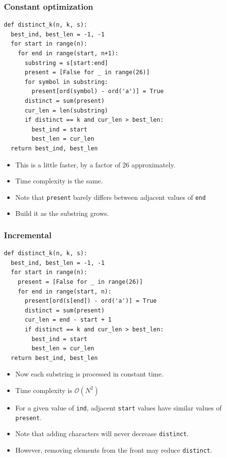 \documentclass{beamer}
\begin{document}
\begin{frame}
    \frametitle{Constant optimization}
	\begin{tiny}
        \begin{verbatim}
def distinct_k(n, k, s):
  best_ind, best_len = -1, -1
  for start in range(n):
    for end in range(start, n+1):
      substring = s[start:end]
      present = [False for _ in range(26)]
      for symbol in substring:
        present[ord(symbol) - ord('a')] = True
      distinct = sum(present)
      cur_len = len(substring)
      if distinct == k and cur_len > best_len:
        best_ind = start
        best_len = cur_len
  return best_ind, best_len
        \end{verbatim}
    \end{tiny}
    \begin{itemize}
        \item<2-> This is a little faster, by a factor of $26$ approximately.
        \item<3-> Time complexity is the same.
        \item<4-> Note that \texttt{present} barely differs between adjacent values of \texttt{end}
        \item<5-> Build it as the substring grows.
    \end{itemize}
\end{frame}

\begin{frame}
    \frametitle{Incremental}
	\begin{tiny}
        \begin{verbatim}
def distinct_k(n, k, s):
  best_ind, best_len = -1, -1
  for start in range(n):
    present = [False for _ in range(26)]
    for end in range(start, n):
      present[ord(s[end]) - ord('a')] = True
      distinct = sum(present)
      cur_len = end - start + 1
      if distinct == k and cur_len > best_len:
        best_ind = start
        best_len = cur_len
  return best_ind, best_len
        \end{verbatim}
    \end{tiny}
    \begin{itemize}
        \item<2-> Now each substring is processed in constant time.
        \item<3-> Time complexity is $\mathcal{O}(N^2)$
        \item<4-> For a given value of \texttt{ind}, adjacent \texttt{start} values have similar values of \texttt{present}.
        \item<5-> Note that adding characters will never decrease \texttt{distinct}.
        \item<6-> However, removing elements from the front may reduce \texttt{distinct}.
    \end{itemize}
\end{frame}
\end{document}
